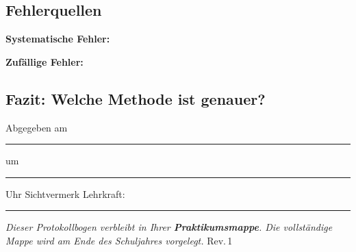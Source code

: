 \documentclass[11pt,a4paper]{scrartcl}
\begin{document}
	\vspace{0.5cm}
	
	\subsection*{Fehlerquellen}
	
	\textbf{Systematische Fehler:}
	
	\vspace{2cm}
	
	\textbf{Zufällige Fehler:}
	
	\vspace{2cm}
	
	\subsection*{Fazit: Welche Methode ist genauer?}
	
	\vspace{3cm}
	

	\vspace{0.4cm}
	\begin{tcolorbox}[colback=yellow!8, colframe=black, boxrule=0.6pt, title={\faIcon{check-circle}\enspace Abgabevermerk -- wird vor Ort ausgefüllt}, fonttitle=\bfseries]
		Abgegeben am \rule{2.8cm}{0.4pt} \enspace um \rule{2cm}{0.4pt} Uhr \hfill Sichtvermerk Lehrkraft: \rule{3.5cm}{0.4pt}

		\vspace{0.15cm}
		{\small\textit{Dieser Protokollbogen verbleibt in Ihrer \textbf{Praktikumsmappe}. Die vollständige Mappe wird am Ende des Schuljahres vorgelegt.} \hfill \scriptsize Rev.\,1}
	\end{tcolorbox}
\end{document}
